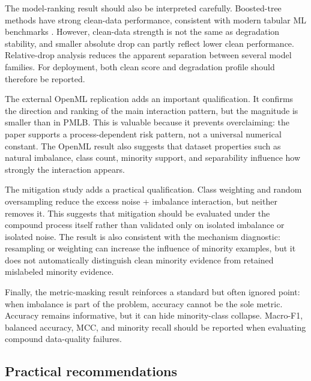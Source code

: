 \documentclass[preprint,12pt,number]{elsarticle}
\begin{document}
The model-ranking result should also be interpreted carefully. Boosted-tree methods have strong clean-data performance, consistent with modern tabular ML benchmarks \citep{grinsztajn2022tree,mcelfresh2023tabzilla}. However, clean-data strength is not the same as degradation stability, and smaller absolute drop can partly reflect lower clean performance. Relative-drop analysis reduces the apparent separation between several model families. For deployment, both clean score and degradation profile should therefore be reported.

The external OpenML replication adds an important qualification. It confirms the direction and ranking of the main interaction pattern, but the magnitude is smaller than in PMLB. This is valuable because it prevents overclaiming: the paper supports a process-dependent risk pattern, not a universal numerical constant. The OpenML result also suggests that dataset properties such as natural imbalance, class count, minority support, and separability influence how strongly the interaction appears.

The mitigation study adds a practical qualification. Class weighting and random oversampling reduce the excess noise + imbalance interaction, but neither removes it. This suggests that mitigation should be evaluated under the compound process itself rather than validated only on isolated imbalance or isolated noise. The result is also consistent with the mechanism diagnostic: resampling or weighting can increase the influence of minority examples, but it does not automatically distinguish clean minority evidence from retained mislabeled minority evidence.

Finally, the metric-masking result reinforces a standard but often ignored point: when imbalance is part of the problem, accuracy cannot be the sole metric. Accuracy remains informative, but it can hide minority-class collapse. Macro-F1, balanced accuracy, MCC, and minority recall should be reported when evaluating compound data-quality failures.

\subsection{Practical recommendations}
\end{document}
